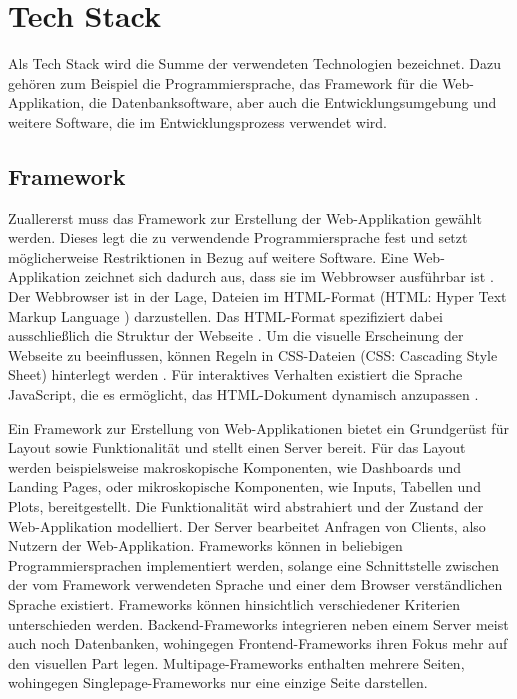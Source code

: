 \documentclass[
]{article}
\begin{document}
\hypertarget{tech-stack}{%
\section{Tech Stack}\label{tech-stack}}

Als Tech Stack wird die Summe der verwendeten Technologien bezeichnet. Dazu gehören zum Beispiel die Programmiersprache, das Framework für die Web-Applikation, die Datenbanksoftware, aber auch die Entwicklungsumgebung und weitere Software, die im Entwicklungsprozess verwendet wird. \autocite[S.61-67]{Küllenberg2020}

\hypertarget{framework}{%
\subsection{Framework}\label{framework}}

Zuallererst muss das Framework zur Erstellung der Web-Applikation gewählt werden. Dieses legt die zu verwendende Programmiersprache fest und setzt möglicherweise Restriktionen in Bezug auf weitere Software. Eine Web-Applikation zeichnet sich dadurch aus, dass sie im Webbrowser ausführbar ist \autocite[S.115]{webappdef}. Der Webbrowser ist in der Lage, Dateien im HTML-Format (HTML: Hyper Text Markup Language \autocite[S.13]{Baumgarten2002}) darzustellen. Das HTML-Format spezifiziert dabei ausschließlich die Struktur der Webseite \autocite[S.13]{Baumgarten2002}. Um die visuelle Erscheinung der Webseite zu beeinflussen, können Regeln in CSS-Dateien (CSS: Cascading Style Sheet) hinterlegt werden \autocite[S.51]{Baumgarten2002}. Für interaktives Verhalten existiert die Sprache JavaScript, die es ermöglicht, das HTML-Dokument dynamisch anzupassen \autocite[S.55]{Baumgarten2002}.

Ein Framework zur Erstellung von Web-Applikationen bietet ein Grundgerüst für Layout sowie Funktionalität und stellt einen Server bereit. Für das Layout werden beispielsweise makroskopische Komponenten, wie Dashboards und Landing Pages, oder mikroskopische Komponenten, wie Inputs, Tabellen und Plots, bereitgestellt. Die Funktionalität wird abstrahiert und der Zustand der Web-Applikation modelliert. Der Server bearbeitet Anfragen von Clients, also Nutzern der Web-Applikation. Frameworks können in beliebigen Programmiersprachen implementiert werden, solange eine Schnittstelle zwischen der vom Framework verwendeten Sprache und einer dem Browser verständlichen Sprache existiert. Frameworks können hinsichtlich verschiedener Kriterien unterschieden werden. Backend-Frameworks integrieren neben einem Server meist auch noch Datenbanken, wohingegen Frontend-Frameworks ihren Fokus mehr auf den visuellen Part legen. Multipage-Frameworks enthalten mehrere Seiten, wohingegen Singlepage-Frameworks nur eine einzige Seite darstellen. \autocite[S.10-12]{framework}
\end{document}
